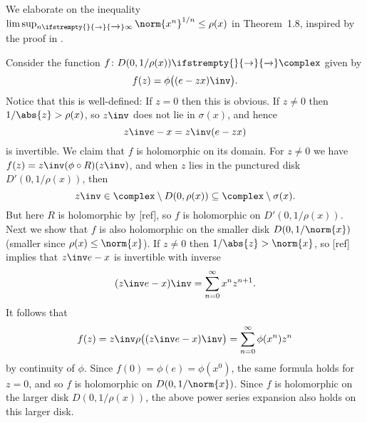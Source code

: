 \documentclass[article, a4paper, 11pt, oneside]{memoir}
\numberwithin{equation}{chapter}
\renewcommand\to[1][]{%
    \ifstrempty{#1}{%
        \rightarrow
    }{%
        \xrightarrow[#1]{}
    }%
}
\begin{document}
\begin{remark}
    We elaborate on the inequality $\limsup_{n\to\infty} \norm{x^n}^{1/n} \leq \rho(x)$ in Theorem~1.8, inspired by the proof in \textcite[Theorem~1.7.3]{arveson2002}.

    Consider the function $f \colon D(0,1/\rho(x)) \to \complex$ given by
    \begin{equation*}
        f(z)
            = \phi \bigl( (e - zx)\inv \bigr).
    \end{equation*}
    Notice that this is well-defined: If $z = 0$ then this is obvious. If $z \neq 0$ then $1/\abs{z} > \rho(x)$, so $z\inv$ does not lie in $\sigma(x)$, and hence
    \begin{equation*}
        z\inv e - x
            = z\inv (e - zx)
    \end{equation*}
    is invertible. We claim that $f$ is holomorphic on its domain. For $z \neq 0$ we have $f(z) = z\inv (\phi \circ R)(z\inv)$, and when $z$ lies in the punctured disk $D'(0,1/\rho(x))$, then
    \begin{equation*}
        z\inv
            \in \complex \setminus D(0,\rho(x))
            \subseteq \complex \setminus \sigma(x).
    \end{equation*}
    But here $R$ is holomorphic by [ref], so $f$ is holomorphic on $D'(0,1/\rho(x))$. Next we show that $f$ is also holomorphic on the smaller disk $D(0,1/\norm{x})$ (smaller since $\rho(x) \leq \norm{x}$). If $z \neq 0$ then $1/\abs{z} > \norm{x}$, so [ref] implies that $z\inv e - x$ is invertible with inverse
    \begin{equation*}
        (z\inv e - x)\inv
            = \sum_{n=0}^\infty x^n z^{n+1}.
    \end{equation*}
    It follows that
    \begin{equation*}
        f(z)
            = z\inv \rho \bigl( (z\inv e - x)\inv \bigr)
            = \sum_{n=0}^\infty \phi(x^n) z^n
    \end{equation*}
    by continuity of $\phi$. Since $f(0) = \phi(e) = \phi(x^0)$, the same formula holds for $z = 0$, and so $f$ is holomorphic on $D(0,1/\norm{x})$. Since $f$ is holomorphic on the larger disk $D(0,1/\rho(x))$, the above power series expansion also holds on this larger disk.


\end{remark}
\end{document}
